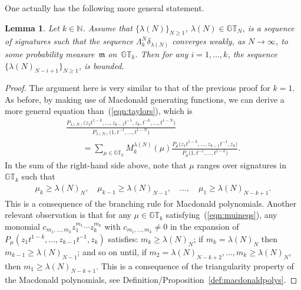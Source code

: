 \documentclass[pdftex]{sigma}
\numberwithin{equation}{section}
\newtheorem{lem}[thm]{Lemma}
\newcommand{\N}{\mathbb{N}}
\newcommand{\GT}{\mathbb{GT}}
\begin{document}
One actually has the following more general statement.


\begin{lem}\label{lem:boundedparts}
Let $k\in\N$. Assume that $\{\lambda(N)\}_{N\geq 1}$, $\lambda(N)\in\GT_N$, is a sequence of signatures such that the sequence $\Lambda^N_k \delta_{\lambda(N)}$ converges weakly, as $N\rightarrow\infty$, to some probability measure~$\mathfrak{m}$ on~$\GT_k$. Then for any $i = 1, \dots, k$, the sequence $\{\lambda(N)_{N-i+1}\}_{N\geq 1}$, is bounded.
\end{lem}

\begin{proof}
The argument here is very similar to that of the previous proof for $k = 1$. As before, by making use of Macdonald generating functions, we can derive a more general equation than~(\ref{eqn:taylors}), which is
\begin{gather}
\frac{P_{\lambda(N)}\big(z_1 t^{1-k}, \dots, z_{k-1}t^{-1}, z_k, t^{-k}, \dots, t^{1-N}\big)}{P_{\lambda(N)}\big(1, t^{-1}, \dots, t^{1-N}\big)}\nonumber\\
\qquad{} = \sum_{\mu\in\GT_k}{M_k^{\lambda(N)}(\mu) \frac{P_{\mu}\big(z_1t^{1-k}, \dots, z_{k-1}t^{-1}, z_k\big)}{P_{\mu}\big(1, t^{-1}, \dots, t^{1-k}\big)}}.\label{eqn:taylors1}
\end{gather}
In the sum of the right-hand side above, note that $\mu$ ranges over signatures in $\GT_k$ such that
\begin{gather}\label{eqn:muineqs}
\mu_k \geq \lambda(N)_N,\quad \mu_{k-1} \geq \lambda(N)_{N-1}, \quad \dots,\quad \mu_1 \geq \lambda(N)_{N-k+1}.
\end{gather}
This is a consequence of the branching rule for Macdonald polynomials.
Another relevant observation is that for any $\mu\in\GT_k$ satisfying~(\ref{eqn:muineqs}), any monomial $c_{m_1, \dots, m_k} z_1^{m_1}\cdots z_k^{m_k}$ with $c_{m_1, \dots, m_k} \neq 0$ in the expansion of $P_{\mu}(z_1t^{1-k}, \dots, z_{k-1}t^{-1}, z_k)$ satisf\/ies: $m_k \geq \lambda(N)_N$; if $m_k = \lambda(N)_N$ then $m_{k-1} \geq \lambda(N)_{N-1}$; and so on until, if $m_2 = \lambda(N)_{N-k+2}, \dots, m_k \geq \lambda(N)_N$, then $m_1 \geq \lambda(N)_{N-k+1}$.
This is a consequence of the triangularity property of the Macdonald polynomials, see Def\/inition/Proposition~\ref{def:macdonaldpolys}.


\end{proof}
\end{document}
